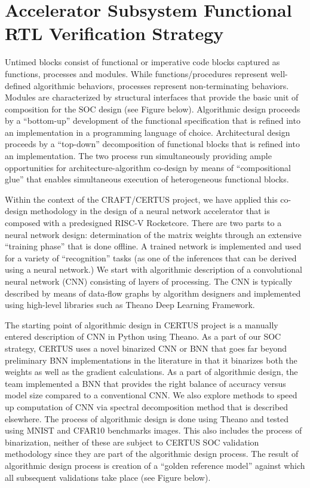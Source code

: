 
\section{Accelerator Subsystem Functional RTL Verification Strategy}


Untimed blocks consist of functional or imperative code blocks captured
as functions, processes and modules. While functions/procedures represent
well-defined algorithmic behaviors, processes represent non-terminating
behaviors. Modules are characterized by structural interfaces that
provide the basic unit of composition for the SOC design (see Figure
below). Algorithmic design proceeds by a ``bottom-up'' development of the
functional specification that is refined into an implementation in a
programming language of choice. Architectural design proceeds by a
``top-down'' decomposition of functional blocks that is refined into an
implementation. The two process run simultaneously providing ample
opportunities for architecture-algorithm co-design by means of
``compositional glue'' that enables simultaneous execution of
heterogeneous functional blocks.

Within the context of the CRAFT/CERTUS project, we have applied this
co-design methodology in the design of a neural network accelerator that
is composed with a predesigned RISC-V Rocketcore. There are two parts to
a neural network design: determination of the matrix weights through an
extensive ``training phase'' that is done offline. A trained network is
implemented and used for a variety of ``recognition'' tasks (as one of
the inferences that can be derived using a neural network.) We start with
algorithmic description of a convolutional neural network (CNN)
consisting of layers of processing. The CNN is typically described by
means of data-flow graphs by algorithm designers and implemented using
high-level libraries such as Theano Deep Learning Framework.

The starting point of algorithmic design in CERTUS project is a manually
entered description of CNN in Python using Theano. As a part of our SOC
strategy, CERTUS uses a novel binarized CNN or BNN that goes far beyond
preliminary BNN implementations in the literature in that it binarizes
both the weights as well as the gradient calculations. As a part of
algorithmic design, the team implemented a BNN that provides the right
balance of accuracy versus model size compared to a conventional CNN. We
also explore methods to speed up computation of CNN via spectral
decomposition method that is described elsewhere. The process of
algorithmic design is done using Theano and tested using MNIST and CFAR10
benchmarks images. This also includes the process of binarization,
neither of these are subject to CERTUS SOC validation methodology since
they are part of the algorithmic design process. The result of
algorithmic design process is creation of a ``golden reference model''
against which all subsequent validations take place (see Figure below).

